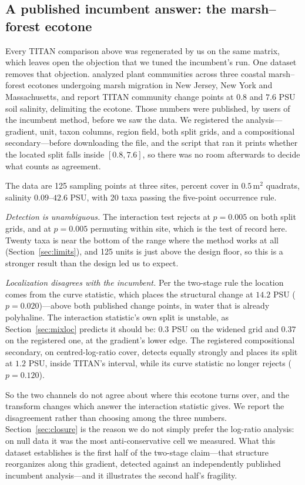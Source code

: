 \documentclass[review,12pt,authoryear]{elsarticle}
\theoremstyle{remark}
\begin{document}


\subsection{A published incumbent answer: the marsh--forest ecotone}
\label{sec:ecotone}

Every TITAN comparison above was regenerated by us on the same matrix, which
leaves open the objection that we tuned the incumbent's run. One dataset
removes that objection. \citet{payne2026ecotone} analyzed plant communities
across three coastal marsh--forest ecotones undergoing marsh migration in
New Jersey, New York and Massachusetts, and report TITAN community change
points at $0.8$ and $7.6$ PSU soil salinity, delimiting the ecotone. Those
numbers were published, by users of the incumbent method, before we saw the
data. We registered the analysis---gradient, unit, taxon columns, region
field, both split grids, and a compositional secondary---before downloading
the file, and the script that ran it prints whether the located split falls
inside $[0.8, 7.6]$, so there was no room afterwards to decide what counts
as agreement.

The data are 125 sampling points at three sites, percent cover in
$0.5\,\mathrm{m}^2$ quadrats, salinity $0.09$--$42.6$ PSU, with 20 taxa
passing the five-point occurrence rule.

\emph{Detection is unambiguous.} The interaction test rejects at
$p = 0.005$ on both split grids, and at $p = 0.005$ permuting within site,
which is the test of record here. Twenty taxa is near the bottom of the
range where the method works at all (Section~\ref{sec:limits}), and 125
units is just above the design floor, so this is a stronger result than the
design led us to expect.

\emph{Localization disagrees with the incumbent.} Per the two-stage rule the
location comes from the curve statistic, which places the structural change
at $14.2$ PSU ($p = 0.020$)---above both published change points, in
water that is already polyhaline. The interaction statistic's own split is
unstable, as Section~\ref{sec:mixloc} predicts it should be: $0.3$ PSU on
the widened grid and $0.37$ on the registered one, at the gradient's lower
edge. The registered compositional secondary, on centred-log-ratio cover,
detects equally strongly and places its split at $1.2$ PSU, inside TITAN's
interval, while its curve statistic no longer rejects ($p = 0.120$).

So the two channels do not agree about where this ecotone turns over, and
the transform changes which answer the interaction statistic gives. We
report the disagreement rather than choosing among the three numbers.
Section~\ref{sec:closure} is the reason we do not simply prefer the
log-ratio analysis: on null data it was the most anti-conservative cell we
measured. What this dataset establishes is the first half of the two-stage
claim---that structure reorganizes along this gradient, detected against an
independently published incumbent analysis---and it illustrates the second
half's fragility.
\end{document}
